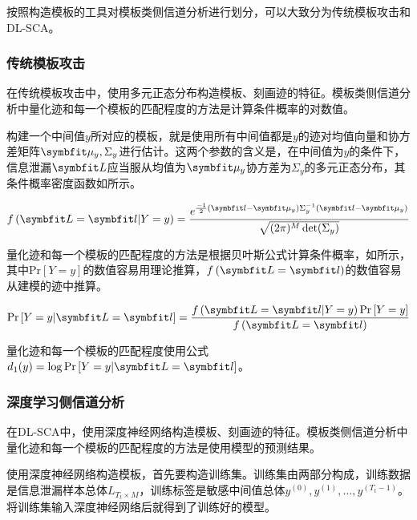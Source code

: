 {	按照构造模板的工具对模板类侧信道分析进行划分，可以大致分为传统模板攻击和DL-SCA。
	\subsubsection{传统模板攻击}
	
	在传统模板攻击中，使用多元正态分布构造模板、刻画迹的特征。模板类侧信道分析中量化迹和每一个模板的匹配程度的方法是计算条件概率的对数值。
	
	构建一个中间值$y$所对应的模板，就是使用所有中间值都是$y$的迹对均值向量和协方差矩阵$\Vector {\mu_y},\Sigma_y$进行估计。这两个参数的含义是，在中间值为$y$的条件下，信息泄漏$\Vector L$应当服从均值为$\Vector {\mu_y}$协方差为$\Sigma_y$的多元正态分布，其条件概率密度函数如所示。
	
	\begin{equation}\label{eq:f(b|a)}
		f\left(\Vector L=\Vector l|Y=y \right)=\frac{e^{\frac{-1}2(\Vector l-\Vector {\mu_y})\Sigma_y^{-1}(\Vector l-\Vector {\mu_y})}}{\sqrt{(2\pi)^M\det (\Sigma_y)}}
	\end{equation}
	
	
	量化迹和每一个模板的匹配程度的方法是根据贝叶斯公式计算条件概率，如所示，其中$\mathrm{Pr}\left[Y=y \right]$的数值容易用理论推算，$f\left(\Vector L=\Vector l\right)$的数值容易从建模的迹中推算。
	
	\begin{equation}\label{eq:pr(a|b)}
		\mathrm{Pr}\left[Y=y|\Vector L=\Vector l \right]=\frac{f\left(\Vector L=\Vector l|Y=y \right)\mathrm{Pr}\left[Y=y \right]}{f\left(\Vector L=\Vector l\right)}
	\end{equation}
	
	量化迹和每一个模板的匹配程度使用公式$d_1(y)=\log \mathrm{Pr}\left[Y=y|\Vector L=\Vector l \right]$。
	\subsubsection{深度学习侧信道分析}
	在DL-SCA中，使用深度神经网络构造模板、刻画迹的特征。模板类侧信道分析中量化迹和每一个模板的匹配程度的方法是使用模型的预测结果。
	
	使用深度神经网络构造模板，首先要构造训练集。训练集由两部分构成，训练数据是信息泄漏样本总体$L_{T_t\times M}$，训练标签是敏感中间值总体$y^{(0)},y^{(1)},\dots,y^{(T_t-1)}$。将训练集输入深度神经网络后就得到了训练好的模型。
	
}
